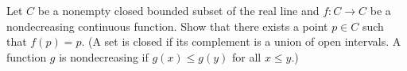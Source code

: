 Let $ C$ be a nonempty closed bounded subset of the real line and $ f: C\to C$ be a nondecreasing continuous function. Show that there exists a point $ p\in C$ such that $ f(p) = p$.
(A set is closed if its complement is a union of open intervals. A function $ g$ is nondecreasing if $ g(x)\le g(y)$ for all $ x\le y$.)